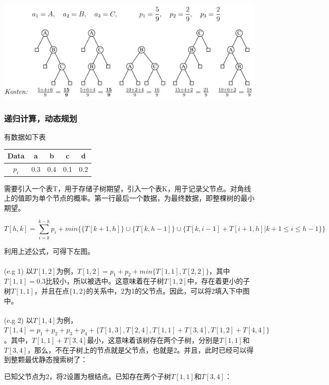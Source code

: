 \documentclass[a4paper]{article}    %
\begin{document}
\begin{center}
    \includegraphics[scale=0.6]{41.png}
\end{center}

\subsubsection{递归计算，动态规划}

有数据如下表

\begin{center}
    \begin{tabular}{|c|c|c|c|c|}
        \hline
            Data&a&b&c&d\\
            \hline
            $p_i$&0.3&0.4&0.1&0.2\\
            \hline
    \end{tabular}
\end{center}

需要引入一个表T，用于存储子树期望，引入一个表K，用于记录父节点。对角线上的值即为单个节点的概率。第一行最后一个数据，为最终数据，即整棵树的最小期望。

$$T[h,k]=\sum^{k-h}_{i=k}p_i+min\{ \{T[k+1,h]\} \cup \{T[k,h-1]\} \cup \{T[k,i-1]+T[i+1,h]|k+1\leq i \leq h-1\} \}$$

利用上述公式，可得下左图。
\\
\\
\indent (e.g 1) 以$T[1,2]$为例，$T[1,2]=p_1+p_2+min\{T[1,1],T[2,2]\}$，其中$T[1,1]=0.3$比较小，所以被选中。这意味着在子树$T[1,2]$中，存在着更小的子树$T[1,1]$，并且在点$\{1,2\}$的关系中，2为1的父节点。因此，可以将2填入下中图中。
\\
\\
\indent (e.g 2) 以$T[1,4]$为例，$T[1,4]=p_1+p_2+p_3+p_4+\{T[1,3],T[2,4],T[1,1]+T[3,4],T[1,2]+T[4,4]\}$。其中，$T[1,1]+T[3,4]$最小，这意味着该树存在两个子树，分别是$T[1,1]$和$T[3,4]$，那么，不在子树上的节点就是父节点，也就是2。并且，此时已经可以得到整颗最优静态搜索树了：

\indent\indent 已知父节点为2，将2设置为根结点。已知存在两个子树$T[1,1]$和$T[3,4]$：
\end{document}
